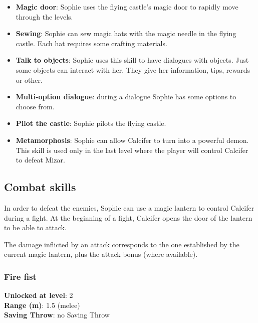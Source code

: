 \begin{itemize}
\item \textbf{Magic door}: Sophie uses the flying castle's magic door to rapidly move through the levels.
\item \textbf{Sewing}: Sophie can sew magic hats with the magic needle in the flying castle. Each hat requires some crafting materials.
\item \textbf{Talk to objects}: Sophie uses this skill to have dialogues with objects. Just some objects can interact with her. They give her information, tips, rewards or other.
\item \textbf{Multi-option dialogue}: during a dialogue Sophie has some options to choose from.
\item \textbf{Pilot the castle}: Sophie pilots the flying castle.
\item \textbf{Metamorphosis}: Sophie can allow Calcifer to turn into a powerful demon. This skill is used only in the last level where the player will control Calcifer to defeat Mizar.
\end{itemize}

\subsection{Combat skills}
In order to defeat the enemies, Sophie can use a magic lantern to control Calcifer during a fight. At the beginning of a fight, Calcifer opens the door of the lantern to be able to attack.

The damage inflicted by an attack corresponds to the one established by the current magic lantern, plus the attack bonus (where available).

\subsubsection{Fire fist}
\textbf{Unlocked at level}: 2 \\
\textbf{Range (m)}: 1.5 (melee) \\
\textbf{Saving Throw}: no Saving Throw

